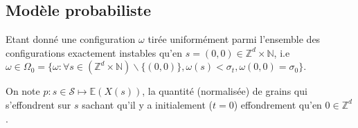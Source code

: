 \documentclass{article}
\theoremstyle{definition}
\begin{document}
\subsection{Modèle probabiliste}
Etant donné une configuration $\omega$ tirée uniformément parmi l'ensemble des configurations exactement instables qu'en $s=(0,0)\in\mathbb{Z}^d\times\mathbb{N}$, i.e $ \omega \in \Omega_{0} = \{\omega : \forall s\in (\mathbb{Z}^d\times\mathbb{N})\backslash\{(0,0)\}, \omega(s)<\sigma_t, \omega(0, 0) = \sigma_0\}$. 

On note $p:s\in\mathcal{S}\mapsto \mathbb{E}(X(s))$, la quantité (normalisée) de grains qui s'effondrent sur $s$ sachant qu'il y a initialement ($t=0$) effondrement qu'en $0\in\mathbb{Z}^d$. 

\end{document}
